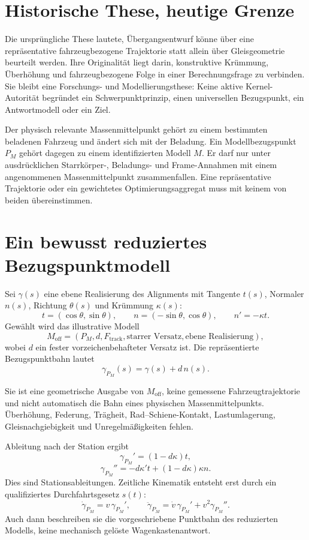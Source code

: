\section{Historische These, heutige Grenze}

Die ursprüngliche These lautete, Übergangsentwurf könne über eine
repräsentative fahrzeugbezogene Trajektorie statt allein über Gleisgeometrie
beurteilt werden. Ihre Originalität liegt darin, konstruktive Krümmung,
Überhöhung und fahrzeugbezogene Folge in einer Berechnungsfrage zu verbinden.
Sie bleibt eine Forschungs- und Modellierungsthese: Keine aktive
Kernel-Autorität begründet ein Schwerpunktprinzip, einen universellen
Bezugspunkt, ein Antwortmodell oder ein Ziel.

Der physisch relevante Massenmittelpunkt gehört zu einem bestimmten beladenen
Fahrzeug und ändert sich mit der Beladung. Ein Modellbezugspunkt \(P_M\) gehört
dagegen zu einem identifizierten Modell \(M\). Er darf nur unter ausdrücklichen
Starrkörper-, Beladungs- und Frame-Annahmen mit einem angenommenen
Massenmittelpunkt zusammenfallen. Eine repräsentative Trajektorie oder ein
gewichtetes Optimierungsaggregat muss mit keinem von beiden übereinstimmen.

\section{Ein bewusst reduziertes Bezugspunktmodell}

Sei \(\gamma(s)\) eine ebene Realisierung des Alignments mit Tangente \(t(s)\),
Normaler \(n(s)\), Richtung \(\theta(s)\) und Krümmung \(\kappa(s)\):
\[
t=(\cos\theta,\sin\theta),\qquad
n=(-\sin\theta,\cos\theta),\qquad n'=-\kappa t.
\]
Gewählt wird das illustrative Modell
\[
M_{\mathrm{off}}=(P_M,d,F_{\mathrm{track}},
\text{starrer Versatz},\text{ebene Realisierung}),
\]
wobei \(d\) ein fester vorzeichenbehafteter Versatz ist. Die repräsentierte
Bezugspunktbahn lautet
\[
\gamma_{P_M}(s)=\gamma(s)+d\,n(s).
\]

Sie ist eine geometrische Ausgabe von \(M_{\mathrm{off}}\), keine gemessene
Fahrzeugtrajektorie und nicht automatisch die Bahn eines physischen
Massenmittelpunkts. Überhöhung, Federung, Trägheit, Rad--Schiene-Kontakt,
Lastumlagerung, Gleisnachgiebigkeit und Unregelmäßigkeiten fehlen.

Ableitung nach der Station ergibt
\[
\gamma_{P_M}'=(1-d\kappa)t,
\]
\[
\gamma_{P_M}''
=-d\kappa't+(1-d\kappa)\kappa n.
\]
Dies sind Stationsableitungen. Zeitliche Kinematik entsteht erst durch ein
qualifiziertes Durchfahrtsgesetz \(s(t)\):
\[
\dot\gamma_{P_M}=v\,\gamma_{P_M}',\qquad
\ddot\gamma_{P_M}=\dot v\,\gamma_{P_M}'+v^2\gamma_{P_M}''.
\]
Auch dann beschreiben sie die vorgeschriebene Punktbahn des reduzierten
Modells, keine mechanisch gelöste Wagenkastenantwort.

